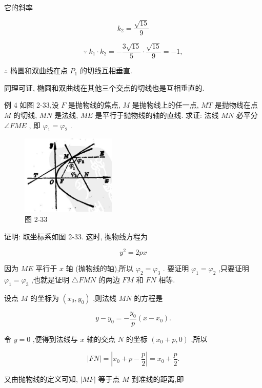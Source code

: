 \documentclass[lang=cn,newtx,10pt,scheme=chinese]{elegantbook}
\begin{document}
它的斜率

\[
    {k}_{2} = \frac{\sqrt{15}}{9}
\]

\[
  \because \;{k}_{1} \cdot {k}_{2} = - \frac{3\sqrt{15}}{5} \cdot \frac{\sqrt{15}}{9} = - 1,
\]

\(\therefore\) 椭圆和双曲线在点 \({P}_{1}\) 的切线互相垂直.

同理可证, 椭圆和双曲线在其他三个交点的切线也是互相垂直的.

例 4 如图 2-33,设 \(F\) 是抛物线的焦点, \(M\) 是抛物线上的任一点, \({MT}\) 是抛物线在点 \(M\) 的切线, \({MN}\) 是法线, \({ME}\) 是平行于抛物线的轴的直线. 求证: 法线 \({MN}\) 必平分 \(\angle {FME}\) , 即 \({\varphi }_{1} = {\varphi }_{2}\) .

\begin{figure}[h]
  \centering
  \includegraphics[max width=0.4\textwidth]{images/01912cc2-ffb6-728e-9ae7-b113ff05c64b_122_544824.jpg}
  \caption{图 2-33}
\end{figure}



证明: 取坐标系如图 2-33. 这时, 抛物线方程为

\[
    {y}^{2} = {2px}
\]

因为 \({ME}\) 平行于 \(x\) 轴 (抛物线的轴),所以 \({\varphi }_{2} = {\varphi }_{3}\) . 要证明 \({\varphi }_{1} = {\varphi }_{2}\) ,只要证明 \({\varphi }_{1} = {\varphi }_{3}\) ,也就是证明 \(\bigtriangleup {FMN}\) 的两边 \({FM}\) 和 \({FN}\) 相等.

设点 \(M\) 的坐标为 \(\left( {{x}_{0},{y}_{0}}\right)\) ,则法线 \({MN}\) 的方程是

\[
  y - {y}_{0} = - \frac{{y}_{0}}{p}\left( {x - {x}_{0}}\right) .
\]

令 \(y = 0\) ,便得到法线与 \(x\) 轴的交点 \(N\) 的坐标 \(\left( {{x}_{0} + p,0}\right)\) ,所以

\[
  \left| {FN}\right| = \left| {{x}_{0} + p - \frac{p}{2}}\right| = {x}_{0} + \frac{p}{2}.
\]

又由抛物线的定义可知, \(\left| {MF}\right|\) 等于点 \(M\) 到准线的距离,即
\end{document}

